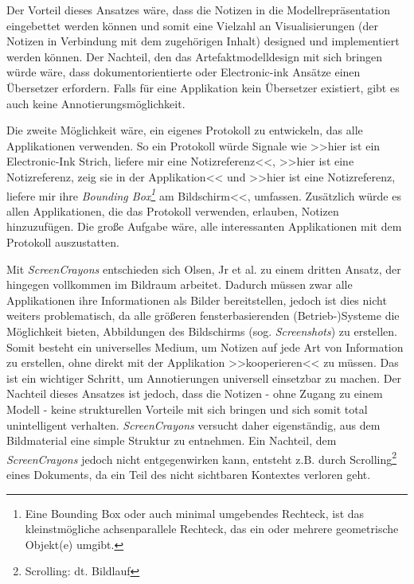 Der Vorteil dieses Ansatzes wäre, dass die Notizen in die Modellrepräsentation eingebettet werden können und somit eine Vielzahl an Visualisierungen (der Notizen in Verbindung mit dem zugehörigen Inhalt) designed und implementiert werden können. Der Nachteil, den das Artefaktmodelldesign mit sich bringen würde wäre, dass dokumentorientierte oder Electronic-ink Ansätze einen Übersetzer erfordern. Falls für eine Applikation kein Übersetzer existiert, gibt es auch keine Annotierungsmöglichkeit.

\medskip Die zweite Möglichkeit wäre, ein eigenes Protokoll zu entwickeln, das alle Applikationen verwenden. So ein Protokoll würde Signale wie >>hier ist ein Electronic-Ink Strich, liefere mir eine Notizreferenz<<, >>hier ist eine Notizreferenz, zeig sie in der Applikation<< und >>hier ist eine Notizreferenz, liefere mir ihre \emph{Bounding Box\footnote{Eine Bounding Box oder auch minimal umgebendes Rechteck, ist das kleinstmögliche achsenparallele Rechteck, das ein oder mehrere geometrische Objekt(e) umgibt.}} am Bildschirm<<, umfassen. Zusätzlich würde es allen Applikationen, die das Protokoll verwenden, erlauben, Notizen hinzuzufügen. Die große Aufgabe wäre, alle interessanten Applikationen mit dem Protokoll auszustatten.

\medskip Mit \emph{ScreenCrayons} entschieden sich Olsen, Jr et al. zu einem dritten Ansatz, der hingegen vollkommen im Bildraum arbeitet. Dadurch müssen zwar alle Applikationen ihre Informationen als Bilder bereitstellen, jedoch ist dies nicht weiters problematisch, da alle größeren fensterbasierenden (Betrieb-)Systeme die Möglichkeit bieten, Abbildungen des Bildschirms (sog. \emph{Screenshots}) zu erstellen.  Somit besteht ein universelles Medium, um Notizen auf jede Art von Information zu erstellen, ohne direkt mit der Applikation >>kooperieren<< zu müssen. Das ist ein wichtiger Schritt, um Annotierungen universell einsetzbar zu machen. Der Nachteil dieses Ansatzes ist jedoch, dass die Notizen - ohne Zugang zu einem Modell - keine strukturellen Vorteile mit sich bringen und sich somit total unintelligent verhalten. \emph{ScreenCrayons} versucht daher  eigenständig, aus dem Bildmaterial eine simple Struktur zu entnehmen. Ein Nachteil, dem \emph{ScreenCrayons} jedoch nicht entgegenwirken kann, entsteht z.B. durch Scrolling\footnote{Scrolling: dt. Bildlauf} eines Dokuments, da ein Teil des nicht sichtbaren Kontextes verloren geht.

